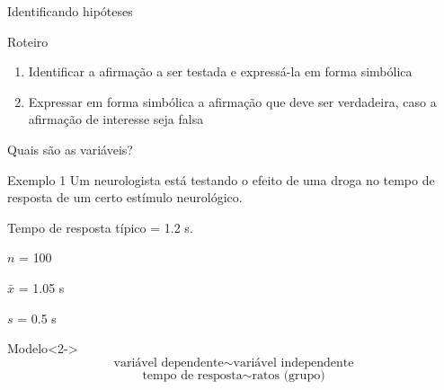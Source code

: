 \documentclass{beamer}
\begin{document}
\begin{frame}{\scriptsize Identificando hipóteses}
  \begin{block}{Roteiro}
    \begin{enumerate}
      \footnotesize
    \item Identificar a afirmação a ser testada e expressá-la em forma simbólica
    \bigskip
    \item Expressar em forma simbólica a afirmação que deve ser
      verdadeira, caso a afirmação de interesse seja falsa
    \end{enumerate}
  \end{block}
\end{frame}

\begin{frame}{\scriptsize Quais são as variáveis?}
  \begin{exampleblock}{Exemplo 1}
    \tiny
    Um neurologista está testando o efeito de uma droga no tempo de
    resposta de um certo estímulo neurológico.

    \smallskip
    Tempo de resposta típico = \alert{1.2 s}.

    \smallskip
    $n$ = \alert{100}

    $\bar{x}$ = \alert{1.05 s}

    $s$ = \alert{0.5 s}
  \end{exampleblock}
  \begin{block}{Modelo}<2->
    \footnotesize
    \begin{displaymath}
      \text{variável dependente} \sim \text{variável independente}
    \end{displaymath}
    \alert{
    \begin{displaymath}
      \text{tempo de resposta} \sim \text{ratos (grupo)}
    \end{displaymath}
    }
  \end{block}
\end{frame}
\end{document}
